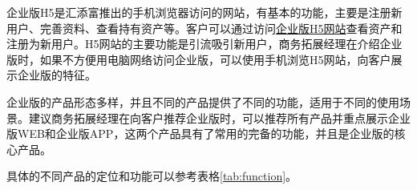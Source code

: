 企业版H5是汇添富推出的手机浏览器访问的网站，有基本的功能，主要是注册新用户、完善资料、查看持有资产等。客户可以通过访问\href{mqy.99fund.com}{企业版H5网站}查看资产和注册为新用户。H5网站的主要功能是引流吸引新用户，商务拓展经理在介绍企业版时，如果不方便用电脑网络访问企业版，可以使用手机浏览H5网站，向客户展示企业版的特征。 \par

\vspace{1.5cm}

 \par

企业版的产品形态多样，并且不同的产品提供了不同的功能，适用于不同的使用场景。建议商务拓展经理在向客户推荐企业版时，可以推荐所有产品并重点展示企业版WEB和企业版APP，这两个产品具有了常用的完备的功能，并且是企业版的核心产品。\par

具体的不同产品的定位和功能可以参考表格\ref{tab:function}。